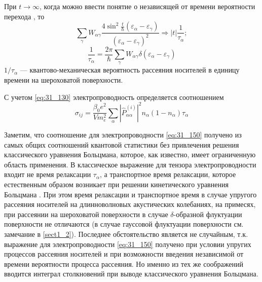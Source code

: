 При $t\to \infty $, когда можно ввести понятие о независящей от времени вероятности перехода \cite{LandauT3}, то
\begin{equation} \label{eq:31_130}
\sum_{\gamma }{W_{\alpha \gamma }\frac{4 \sin^2 \frac{t}{\hbar}\left({\varepsilon }_{\alpha }-{\varepsilon }_{\gamma }\right)}{(\varepsilon_{\alpha } - \varepsilon_{\gamma })^2}}\Rightarrow \left|t\right|\frac{1}{{\tau }_{\alpha }};
\end{equation}
\begin{equation} \label{eq:31_140}
\frac{1}{\tau_{\alpha}}=\frac{2\pi}{\hbar} \sum_{\gamma }{W_{\alpha \gamma }\delta \left(\varepsilon_{\alpha} - \varepsilon_{\gamma}\right)}
\end{equation}
${1}/{\tau_{\alpha}}$ --- квантово-механическая вероятность рассеяния носителей в единицу времени на шероховатой поверхности.

С учетом \eqref{eq:31_130} электропроводность определяется соотношением
\begin{equation} \label{eq:31_150}
{\sigma }_{ij}=\frac{{\beta }_0e^2}{Vm^2_e}\sum_{\alpha }{{\left|{\hat{P}}^{(i)}_{\alpha \alpha }\right|}^2n_{\alpha }\left(1-n_{\alpha }\right)}{\tau }_{\alpha }
\end{equation}

Заметим, что соотношение для электропроводности \eqref{eq:31_150} получено из самых общих соотношений квантовой статистики без привлечения решения классического уравнения Больцмана, которое, как известно, имеет ограниченную область применения. В классическое выражение для тензора электропроводности входит не время релаксации ${\tau }_{\alpha }$, а транспортное время релаксации, которое естественным образом возникает при решении кинетического уравнения Больцмана \cite{Anselm1978}. При этом время релаксации и транспортное время в случае упругого рассеяния носителей на длинноволновых акустических колебаниях, на примесях, при рассеянии на шероховатой поверхности в случае $\delta $-образной флуктуации поверхности не отличаются (в случае гауссовой флуктуации поверхности см. замечание в \ref{sect1_2}). Последнее обстоятельство является не случайным, т.к. выражение для электропроводности \eqref{eq:31_150} получено при условии упругих процессов рассеяния носителей и при возможности введения независимой от времени вероятности процесса рассеяния. Но именно из тех же соображений вводится интеграл столкновений при выводе классического уравнения Больцмана.


